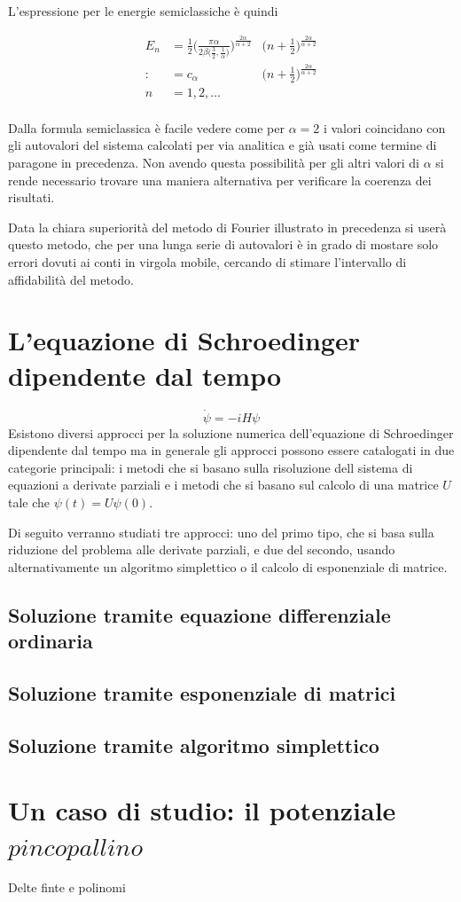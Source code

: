 \documentclass[a4paper,twocolumn,11pt,twoside]{article}
\begin{document}
L'espressione per le energie semiclassiche è quindi

\begin{align*}
    E_n & =
    \frac{1}{2}\Bigg(\frac{\pi\alpha}{2\beta\big(\frac{3}{2},\frac{1}{\alpha}\big)}\Bigg)^\frac{2\alpha}{\alpha+2} &\Bigg(n+\frac{1}{2}\Bigg)^\frac{2\alpha}{\alpha+2} \\
    :&= c_{\alpha} &\Bigg(n+\frac{1}{2}\Bigg)^\frac{2\alpha}{\alpha+2} \\
    n&=1,2,\dots\\
\end{align*}

Dalla formula semiclassica è facile vedere come per \(\alpha=2\) i valori coincidano con gli autovalori del sistema calcolati per via analitica e già usati come termine di paragone in precedenza. Non avendo questa possibilità per gli altri valori di \(\alpha\) si rende necessario trovare una maniera alternativa per verificare la coerenza dei risultati.

Data la chiara superiorità del metodo di Fourier illustrato in precedenza si userà questo metodo, che per una lunga serie di autovalori è in grado di mostare solo errori dovuti ai conti in virgola mobile, cercando di stimare l'intervallo di affidabilità del metodo.

\section{L'equazione di Schroedinger dipendente dal tempo}
\begin{equation}
    \dot{\psi}=-iH\psi
\end{equation}
Esistono diversi approcci per la soluzione numerica dell'equazione di Schroedinger dipendente dal tempo ma in generale gli approcci possono essere catalogati in due categorie principali: i metodi che si basano sulla risoluzione dell sistema di equazioni a derivate parziali e i metodi che si basano sul calcolo di una matrice \(U\) tale che \(\psi(t)=U\psi(0)\).

Di seguito verranno studiati tre approcci: uno del primo tipo, che si basa sulla riduzione del problema alle derivate parziali, e due del secondo, usando alternativamente un algoritmo simplettico o il calcolo di esponenziale di matrice.

\subsection{Soluzione tramite equazione differenziale ordinaria}

\subsection{Soluzione tramite esponenziale di matrici}

\subsection{Soluzione tramite algoritmo simplettico}

\section{Un caso di studio: il potenziale \(pinco pallino\)}
Delte finte e polinomi
\end{document}
